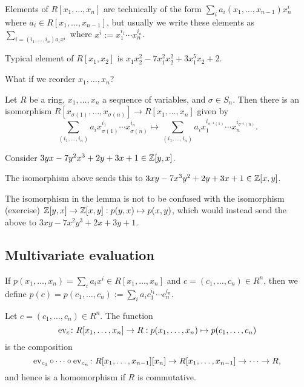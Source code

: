 \documentclass[12pt,letterpaper]{report}
\begin{document}
Elements of $R[x_1, \ldots, x_n]$ are technically of the form
$\sum_i a_i(x_1, \ldots, x_{n - 1})x_n^i$ where $a_i \in R[x_1, \ldots, x_{n - 1}]$, but usually
we write these elements as $\sum_{i = (i_1, \ldots, i_n) a_i x^i}$ where
$x^i := x_1^{i_1} \cdots x_n^{i_n}$.

\begin{ex}
  Typical element of $R[x_1, x_2]$ is $x_1x_2^2 - 7x_1^2x_2^2 + 3x_1^5x_2 + 2$.
\end{ex}

What if we reorder $x_1, \ldots, x_n$?

\begin{lem}{}{}
  Let $R$ be a ring, $x_1, \ldots, x_n$ a sequence of variables, and $\sigma \in S_n$.
  Then there is an isomorphism $R[x_{\sigma(1)}, \ldots, x_{\sigma(n)}] \to R[x_1, \ldots, x_n]$
  given by
  \[
    \sum_{(i_1, \ldots, i_n)} a_i x_{\sigma(1)}^{i_1} \cdots x_{\sigma(n)}^{i_n} \mapsto
      \sum_{(i_1, \ldots, i_n)} a_i x_1^{i_{\sigma^{-1}(1)}} \cdots x_n^{i_{\sigma^{-1}(n)}}.
  \]
\end{lem}

\begin{ex}
  Consider $3yx - 7y^2x^3 + 2y + 3x + 1 \in \mathbb{Z}[y, x]$.

  The isomorphism above sends this to $3xy - 7x^3y^2 + 2y + 3x + 1 \in \mathbb{Z}[x, y]$.

  The isomorphism in the lemma is not to be confused with the isomorphism (exercise)
  $\mathbb{Z}[y, x] \to \mathbb{Z}[x, y] : p(y, x) \mapsto p(x, y)$, which would instead send the above to
  $3xy - 7x^2y^3 + 2x + 3y + 1$.
\end{ex}

\pagebreak
\subsection{Multivariate evaluation}

\begin{defn}{}{}
  If $p(x_1, \ldots, x_n) = \sum_i a_i x^i \in R[x_1, \ldots, x_n]$ and
  $c = (c_1, \ldots, c_n) \in R^n$, then we define
  $p(c) = p(c_1, \ldots, c_n) := \sum_i a_i c_1^{i_1} \cdots c_n^{i_n}$.
\end{defn}

\begin{lem}{}{}
  Let $c = (c_1, \ldots, c_n) \in R^n$.
  The function
  \[ \operatorname{ev}_c \colon R[x_1, \ldots, x_n] \to R : p(x_1, \ldots, x_n) \mapsto p(c_1, \ldots, c_n) \]
  is the composition
  \[
    \operatorname{ev}_{c_1} \circ \cdots \circ \operatorname{ev}_{c_n} \colon
      R[x_1, \ldots, x_{n - 1}][x_n] \to R[x_1, \ldots, x_{n - 1}] \to \cdots \to R,
  \]
  and hence is a homomorphism if $R$ is commutative.
\end{lem}
\end{document}
